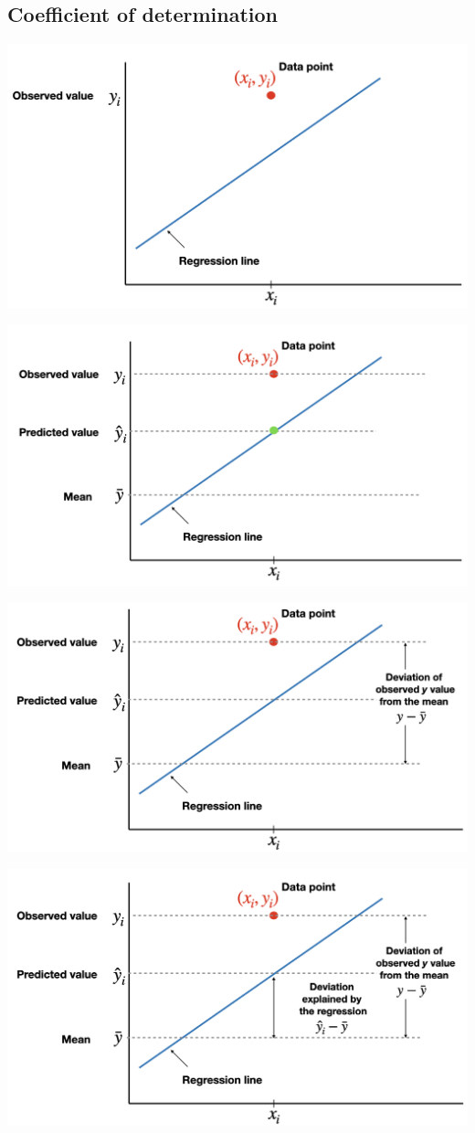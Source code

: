\documentclass[
]{article}
\begin{document}
\hypertarget{coefficient-of-determination-1}{%
\subsection{Coefficient of
determination}\label{coefficient-of-determination-1}}

\begin{center}\includegraphics[width=0.6\linewidth,height=0.6\textheight]{figures/cod1} \end{center}

\begin{center}\includegraphics[width=0.6\linewidth,height=0.6\textheight]{figures/cod2} \end{center}

\begin{center}\includegraphics[width=0.6\linewidth,height=0.6\textheight]{figures/cod3} \end{center}

\begin{center}\includegraphics[width=0.6\linewidth,height=0.6\textheight]{figures/cod4} \end{center}
\end{document}
